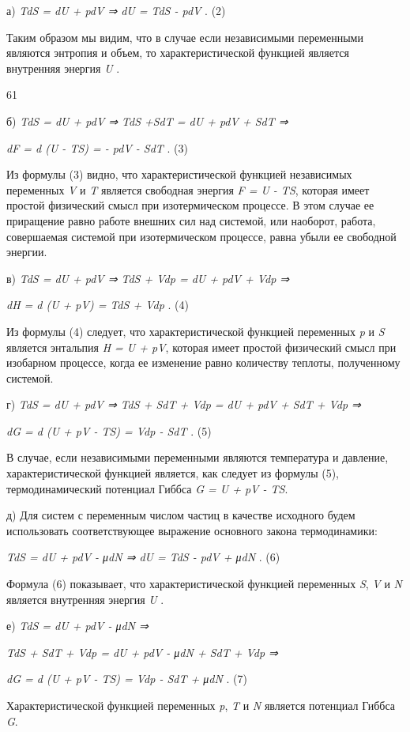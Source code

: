 а) \emph{TdS = dU + pdV ⇒ dU = TdS - pdV} . (2)

Таким образом мы видим, что в случае если независимыми переменными
являются энтропия и объем, то характеристической функцией является
внутренняя энергия \emph{U} .

61

б) \emph{TdS = dU + pdV ⇒ TdS +SdT = dU + pdV + SdT ⇒}

\emph{dF = d (U - TS) = - pdV - SdT} . (3)

Из формулы (3) видно, что характеристической функцией независимых
переменных \emph{V} и \emph{T} является свободная энергия \emph{F = U -
TS}, которая имеет простой физический смысл при изотермическом процессе.
В этом случае ее приращение равно работе внешних сил над системой, или
наоборот, работа, совершаемая системой при изотермическом процессе,
равна убыли ее свободной энергии.

в) \emph{TdS = dU + pdV ⇒ TdS + Vdp = dU + pdV + Vdp ⇒}

\emph{dH = d (U + pV) = TdS + Vdp} . (4)

Из формулы (4) следует, что характеристической функцией переменных
\emph{p} и \emph{S} является энтальпия \emph{H = U + pV}, которая имеет
простой физический смысл при изобарном процессе, когда ее изменение
равно количеству теплоты, полученному системой.

г) \emph{TdS = dU + pdV ⇒ TdS + SdT + Vdp = dU + pdV + SdT + Vdp ⇒}

\emph{dG = d (U + pV - TS) = Vdp - SdT} . (5)

В случае, если независимыми переменными являются температура и давление,
характеристической функцией является, как следует из формулы (5),
термодинамический потенциал Гиббса \emph{G = U + pV - TS}.

д) Для систем с переменным числом частиц в качестве исходного будем
использовать соответствующее выражение основного закона термодинамики:

\emph{TdS = dU + pdV - μdN ⇒ dU = TdS - pdV + μdN} . (6)

Формула (6) показывает, что характеристической функцией переменных
\emph{S}, \emph{V} и \emph{N} является внутренняя энергия \emph{U} .

е) \emph{TdS = dU + pdV - μdN ⇒}

\emph{TdS + SdT + Vdp = dU + pdV - μdN + SdT + Vdp ⇒}

\emph{dG = d (U + pV - TS) = Vdp - SdT + μdN} . (7)

Характеристической функцией переменных \emph{p}, \emph{T} и \emph{N}
является потенциал Гиббса \emph{G}.

